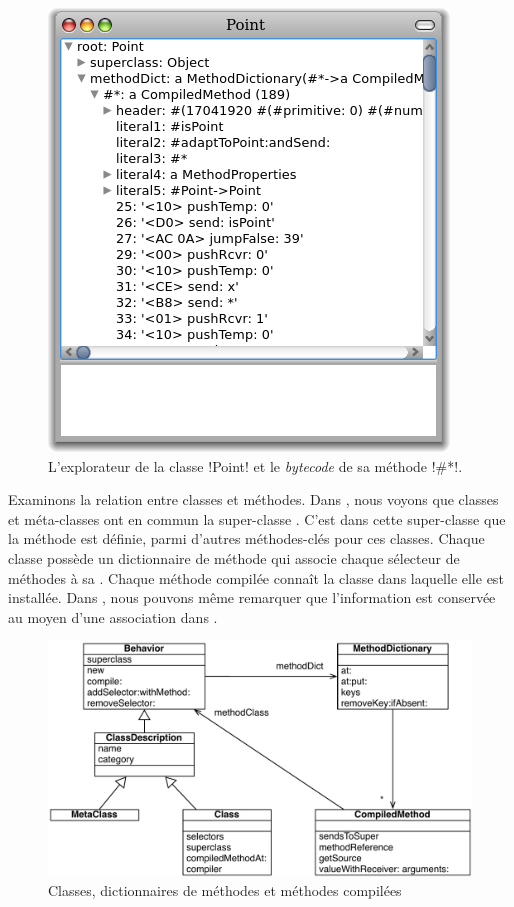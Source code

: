 \documentclass[a4paper,10pt,twoside]{book}
\begin{document}
\begin{figure}[ht]\centering    %
	\includegraphics[width=.5\linewidth]{CompiledMethod}
	\caption{L'explorateur de la classe \ct!Point! et le \emph{bytecode} de sa méthode \ct!\#*!.}
\end{figure}

Examinons la relation entre classes et méthodes.
Dans , nous voyons que classes et méta-classes ont en commun la super-classe . C'est dans cette super-classe que la méthode  est définie, parmi d'autres méthodes-clés pour ces classes. 
Chaque classe possède un dictionnaire de méthode qui associe chaque sélecteur de méthodes à sa .
Chaque méthode compilée connaît la classe dans laquelle elle est installée.
Dans , nous pouvons même remarquer que l'information est conservée au moyen d'une association dans .

\begin{figure}[ht]\centering
	\includegraphics[width=\linewidth]{MethodsAsObjects}
	\caption{Classes, dictionnaires de méthodes et méthodes compilées}
\end{figure}
\end{document}
